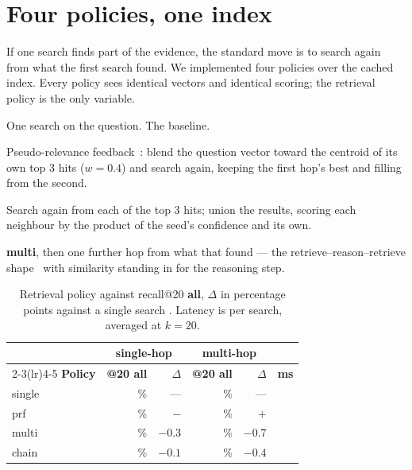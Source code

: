\section{Four policies, one index}
\label{sec:policies}

If one search finds part of the evidence, the standard move is to search again
from what the first search found. We implemented four policies over the cached
index. Every policy sees identical vectors and identical scoring; the retrieval
policy is the only variable.

\begin{description}[leftmargin=1.5cm,style=nextline]
\item[single] One search on the question. The baseline.
\item[prf] Pseudo-relevance feedback~\cite{rocchio}: blend the question vector
  toward the centroid of its own top 3 hits ($w{=}0.4$) and search again,
  keeping the first hop's best and filling from the second.
\item[multi] Search again from each of the top 3 hits; union the results,
  scoring each neighbour by the product of the seed's confidence and its own.
\item[chain] \textbf{multi}, then one further hop from what that found --- the
  retrieve--reason--retrieve shape~\cite{ircot} with similarity standing in for
  the reasoning step.
\end{description}

\begin{table}[h]
\centering
\begin{tabular}{lrrrrr}
\toprule
& \multicolumn{2}{c}{\textbf{single-hop}} & \multicolumn{2}{c}{\textbf{multi-hop}} & \\
\cmidrule(lr){2-3}\cmidrule(lr){4-5}
\textbf{Policy} & \textbf{@20 all} & $\Delta$ & \textbf{@20 all} & $\Delta$ & \textbf{ms} \\
\midrule
single & \rPolSingleS{}\% & ---            & \rPolSingleM{}\% & ---            & \rPolSingleMs{} \\
prf    & \rPolPrfS{}\%    & $-$\rWorstDelta{} & \rPolPrfM{}\%    & $+$\rBestDelta{}  & \rPolPrfMs{} \\
multi  & \rPolMultiS{}\%  & $-0.3$         & \rPolMultiM{}\%  & $-0.7$         & \rPolMultiMs{} \\
chain  & \rPolChainS{}\%  & $-0.1$         & \rPolChainM{}\%  & $-0.4$         & \rPolChainMs{} \\
\bottomrule
\end{tabular}
\caption{Retrieval policy against recall@20 \textbf{all}, $\Delta$ in percentage
points against a single search \meas{}. Latency is per search, averaged at
$k{=}20$.}
\label{tab:policies}
\end{table}

